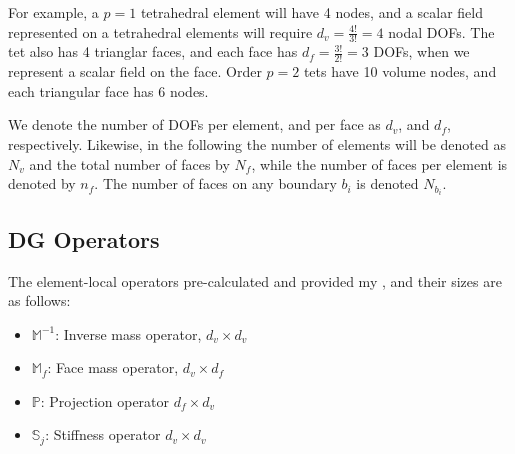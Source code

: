 \documentclass[11pt]{article}
\begin{document}
For example, a $p=1$ tetrahedral element will have 4 nodes, and a scalar field represented on a tetrahedral elements will require $d_v = \frac{4!}{3!} = 4$ nodal DOFs. The tet also has 4 trianglar faces, and each face has $d_f = \frac{3!}{2!} = 3$ DOFs, when we represent a scalar field on the face. Order $p=2$ tets have 10 volume nodes, and each triangular face has 6 nodes. 

We denote the number of DOFs per element, and per face as $d_v$, and $d_f$, respectively. Likewise, in the following the number of elements will be denoted as $N_v$ and the total number of faces by $N_f$, while the number of faces per element is denoted by $n_f$.  The number of faces on any boundary $b_i$ is denoted $N_{b_i}$.

\subsection{\ceesdcode{} DG Operators}

The element-local operators pre-calculated and provided my \ceesdcode{}, and their sizes are as follows:  
\begin{itemize}
\item $\mathbb{M}^{-1}$: Inverse mass operator, $d_v \times d_v$
\item $\mathbb{M}_f$: Face mass operator, $d_v \times d_f$
\item $\mathbb{P}$: Projection operator $d_f \times d_v$
\item $\mathbb{S}_j$: Stiffness operator $d_v \times d_v$
\end{itemize}
\end{document}

